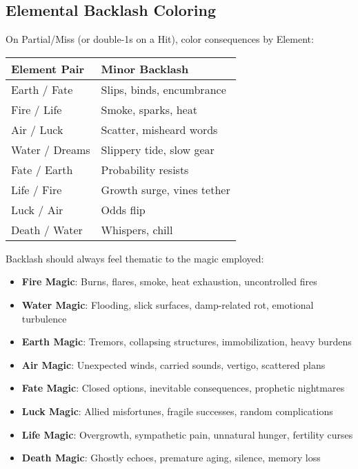 \subsection*{Elemental Backlash Coloring}

On Partial/Miss (or double-1s on a Hit), color consequences by Element:

\begin{fatebox}
\begin{tabularx}{\textwidth}{lX}
\toprule
\textbf{Element Pair} & \textbf{Minor Backlash} \\
\midrule
Earth / Fate & Slips, binds, encumbrance \\
Fire / Life & Smoke, sparks, heat \\
Air / Luck & Scatter, misheard words \\
Water / Dreams & Slippery tide, slow gear \\
Fate / Earth & Probability resists \\
Life / Fire & Growth surge, vines tether \\
Luck / Air & Odds flip \\
Death / Water & Whispers, chill \\
\bottomrule
\end{tabularx}
\end{fatebox}

Backlash should always feel thematic to the magic employed:
\begin{itemize}
    \item \textbf{Fire Magic}: Burns, flares, smoke, heat exhaustion, uncontrolled fires
    \item \textbf{Water Magic}: Flooding, slick surfaces, damp-related rot, emotional turbulence
    \item \textbf{Earth Magic}: Tremors, collapsing structures, immobilization, heavy burdens
    \item \textbf{Air Magic}: Unexpected winds, carried sounds, vertigo, scattered plans
    \item \textbf{Fate Magic}: Closed options, inevitable consequences, prophetic nightmares
    \item \textbf{Luck Magic}: Allied misfortunes, fragile successes, random complications
    \item \textbf{Life Magic}: Overgrowth, sympathetic pain, unnatural hunger, fertility curses
    \item \textbf{Death Magic}: Ghostly echoes, premature aging, silence, memory loss
\end{itemize}

